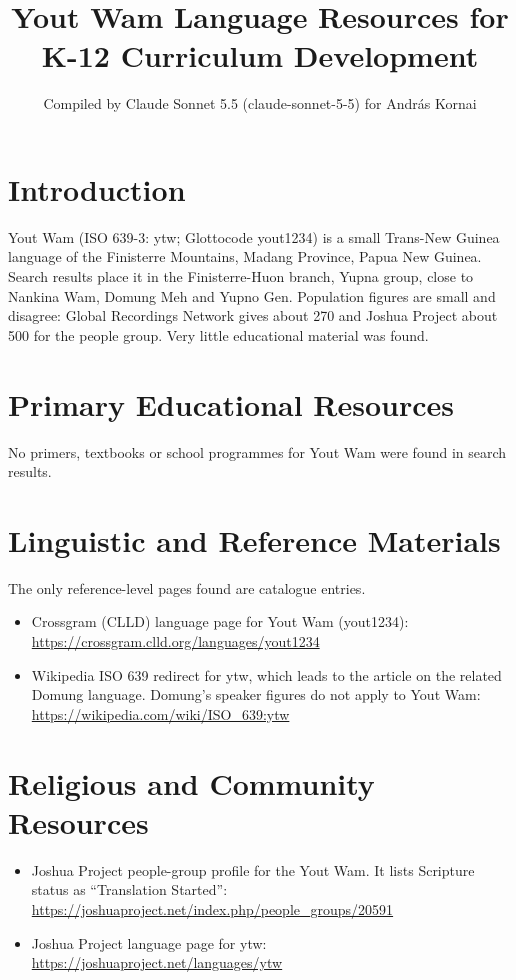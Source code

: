 \documentclass[12pt]{article}
\title{Yout Wam Language Resources for K-12 Curriculum Development}
\author{Compiled by Claude Sonnet 5.5 (claude-sonnet-5-5) for Andr\'as Kornai}
\date{}
\begin{document}
\maketitle

\section{Introduction}
Yout Wam (ISO 639-3: ytw; Glottocode yout1234) is a small Trans-New Guinea language of the Finisterre Mountains, Madang Province, Papua New Guinea. Search results place it in the Finisterre-Huon branch, Yupna group, close to Nankina Wam, Domung Meh and Yupno Gen. Population figures are small and disagree: Global Recordings Network gives about 270 and Joshua Project about 500 for the people group. Very little educational material was found.

\section{Primary Educational Resources}
No primers, textbooks or school programmes for Yout Wam were found in search results.

\section{Linguistic and Reference Materials}
The only reference-level pages found are catalogue entries.
\begin{itemize}
\item Crossgram (CLLD) language page for Yout Wam (yout1234): \url{https://crossgram.clld.org/languages/yout1234}
\item Wikipedia ISO 639 redirect for ytw, which leads to the article on the related Domung language. Domung's speaker figures do not apply to Yout Wam: \url{https://wikipedia.com/wiki/ISO_639:ytw}
\end{itemize}

\section{Religious and Community Resources}
\begin{itemize}
\item Joshua Project people-group profile for the Yout Wam. It lists Scripture status as ``Translation Started'': \url{https://joshuaproject.net/index.php/people_groups/20591}
\item Joshua Project language page for ytw: \url{https://joshuaproject.net/languages/ytw}
\end{itemize}
\end{document}
